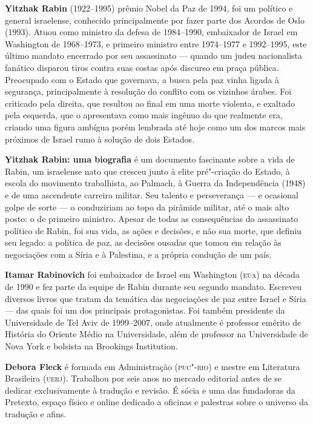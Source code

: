 \textbf{Yitzhak Rabin} (1922--1995) prêmio Nobel da Paz de 1994, foi um político e general israelense, conhecido principalmente por fazer parte dos Acordos de Oslo (1993). Atuou como ministro da defesa de 1984--1990, embaixador de Israel em Washington de 1968--1973, e primeiro ministro entre 1974--1977 e 1992--1995, este último mandato encerrado por seu assassinato --- quando um judeu nacionalista fanático disparou tiros contra suas costas após discurso em praça pública. Preocupado com o Estado que governava, a busca pela paz vinha ligada à segurança, principalmente à resolução do conflito com os vizinhos árabes. Foi criticado pela direita, que resultou ao final em uma morte violenta, e exaltado pela esquerda, que o apresentava como mais ingênuo do que realmente era, criando uma figura ambígua porém lembrada até hoje como um dos marcos mais próximos de Israel rumo à solução de dois Estados.

\textbf{Yitzhak Rabin: uma biografia} é um documento fascinante sobre a vida de Rabin, um israelense nato que cresceu junto à elite pré"-criação do Estado, à escola do movimento trabalhista, ao Palmach, à Guerra da Independência (1948) e de uma ascendente carreira militar. Seu talento e perseverança --- e ocasional golpe de sorte --- o conduziriam ao topo da pirâmide militar, até o mais alto posto: o de primeiro ministro. Apesar de todas as consequências do assassinato político de Rabin, foi sua vida, as ações e decisões, e não sua morte, que definiu seu legado: a política de paz, as decisões ousadas que tomou em relação às negociações com a Síria e à Palestina, e a própria condução de um país.

\textbf{Itamar Rabinovich} foi embaixador de Israel em Washington (\textsc{eua}) na década de 1990 e fez parte da equipe de Rabin durante seu segundo mandato. Escreveu diversos livros que tratam da temática das negociações de paz entre Israel e Síria --- das quais foi um dos principais protagonistas. Foi também presidente da Universidade de Tel Aviv de 1999--2007, onde atualmente é professor emérito de História do Oriente Médio na Universidade, além de professor na Universidade de Nova York e bolsista na Brookings Institution.

\textbf{Debora Fleck} é formada em Administração (\textsc{puc"-rio}) e mestre em Literatura Brasileira (\textsc{uerj}). Trabalhou por seis anos no mercado editorial antes de se dedicar exclusivamente à tradução e revisão. É sócia e uma das fundadoras da Pretexto, espaço físico e online dedicado a oficinas e palestras sobre o universo da tradução e afins.

